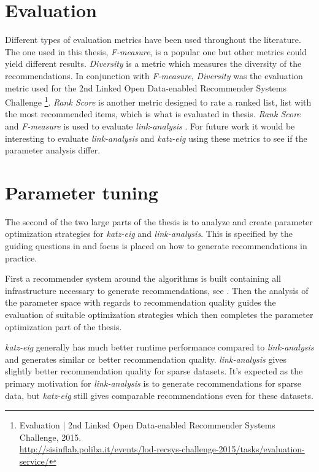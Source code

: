 \section{Evaluation}

Different types of evaluation metrics have been used throughout the literature. The one used in this thesis, \textit{F-measure}, is a popular one but other metrics could yield different results. \textit{Diversity} \citep{bobadilla2013recommender} is a metric which measures the diversity of the recommendations. In conjunction with \textit{F-measure}, \textit{Diversity} was the evaluation metric used for the 2nd Linked Open Data-enabled Recommender Systems Challenge
\footnote{
Evaluation | 2nd Linked Open Data-enabled Recommender Systems Challenge, 2015. \\
\url{http://sisinflab.poliba.it/events/lod-recsys-challenge-2015/tasks/evaluation-service/}
}.
\textit{Rank Score} \cite{huang2007comparison} is another metric designed to rate a ranked list, list with the most recommended items, which is what is evaluated in thesis. \textit{Rank Score} and \textit{F-measure} is used to evaluate \textit{link-analysis} \cite{huang2007comparison}. For future work it would be interesting to evaluate \textit{link-analysis} and \textit{katz-eig} using these metrics to see if the parameter analysis differ.


\section{Parameter tuning}

The second of the two large parts of the thesis is to analyze and create parameter optimization strategies for \textit{katz-eig} and \textit{link-analysis}. This is specified by the guiding questions in  and focus is placed on how to generate recommendations in practice.

First a recommender system around the algorithms is built containing all infrastructure necessary to generate recommendations, see . Then the analysis of the parameter space with regards to recommendation quality guides the evaluation of suitable optimization strategies which then completes the parameter optimization part of the thesis.

\textit{katz-eig} generally has much better runtime performance compared to \textit{link-analysis} and generates similar or better recommendation quality. \textit{link-analysis} gives slightly better recommendation quality for sparse datasets. It's expected as the primary motivation for \textit{link-analysis} is to generate recommendations for sparse data, but \textit{katz-eig} still gives comparable recommendations even for these datasets.

